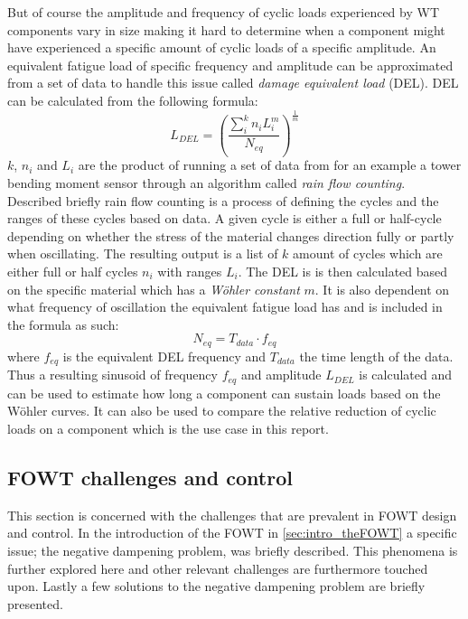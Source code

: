 But of course the amplitude and frequency of cyclic loads experienced by WT components vary in size making it hard to determine when a component might have experienced a specific amount of cyclic loads of a specific amplitude. An equivalent fatigue load of specific frequency and amplitude can be approximated from a set of data to handle this issue called \textit{damage equivalent load} (DEL). DEL can be calculated from the following formula:
\begin{equation}\label{eq:del}
	L_{DEL} = \left( \dfrac{\sum_{i}^{k}n_i L_i^m}{N_{eq}} \right)^{\frac{1}{m}}
\end{equation}
$ k $, $ n_i $ and $ L_i $ are the product of running a set of data from for an example a tower bending moment sensor through an algorithm called \textit{rain flow counting}. Described briefly rain flow counting is a process of defining the cycles and the ranges of these cycles based on data. A given cycle is either a full or half-cycle depending on whether the stress of the material changes direction fully or partly when oscillating. The resulting output is a list of $ k $ amount of cycles which are either full or half cycles $ n_i $ with ranges $ L_i $. The DEL is is then calculated based on the specific material which has a \textit{Wöhler constant} $ m $. It is also dependent on what frequency of oscillation the equivalent fatigue load has and is included in the formula as such:
\begin{equation}\label{key}
	N_{eq} = T_{data} \cdot f_{eq}
\end{equation} 
where $ f_{eq} $ is the equivalent DEL frequency and $ T_{data} $ the time length of the data. Thus a resulting sinusoid of frequency $ f_{eq} $ and amplitude $ L_{DEL} $ is calculated and can be used to estimate how long a component can sustain loads based on the Wöhler curves. It can also be used to compare the relative reduction of cyclic loads on a component which is the use case in this report.


\clearpage \newpage
\subsection{FOWT challenges and control} \label{sec:theory_fowt_challenges}
This section is concerned with the challenges that are prevalent in FOWT design and control. In the introduction of the FOWT in \cref{sec:intro_theFOWT} a specific issue; the negative dampening problem, was briefly described. This phenomena is further explored here and other relevant challenges are furthermore touched upon. Lastly a few solutions to the negative dampening problem are briefly presented.

